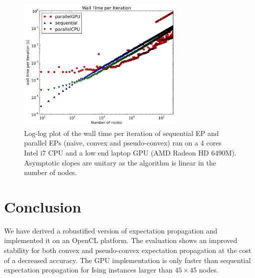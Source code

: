 \documentclass[times, 10pt,twocolumn]{article}
\begin{document}
\begin{figure}[h!]\centering
	\includegraphics[width=8cm]{plots/sizes/time_per_iteration.png}
	\caption{Log-log plot of the wall time per iteration of sequential EP and parallel EPs (naive, convex and pseudo-convex) ran on a 4 cores Intel i7 CPU and a low end laptop GPU (AMD Radeon HD 6490M). Asymptotic slopes are unitary as the algorithm is linear in the number of nodes.}
	\label{speed}
\end{figure}

\section{Conclusion}
We have derived a robustified version of expectation propagation and implemented it on an OpenCL platform. The evaluation shows an improved stability for both convex and pseudo-convex expectation propagation at the cost of a decreased accuracy. The GPU implementation is only faster than sequential expectation propagation for Ising instances larger than $45 \times 45$ nodes.


 
\end{document}
